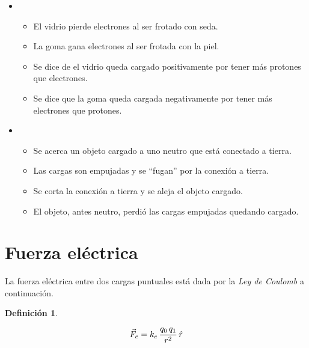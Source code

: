 \documentclass[a5paper,12pt,twoside]{book}
\newtheorem{defn}{{Definición}}[chapter]
\begin{document}
\begin{itemize}
    \item {}
    
    \begin{itemize}
        \item El vidrio pierde electrones al ser frotado con seda.
        \item La goma gana electrones al ser frotada con la piel.
        \item Se dice de el vidrio queda cargado positivamente por tener más protones que electrones.
        \item Se dice que la goma queda cargada negativamente por tener más electrones que protones.
    \end{itemize}

    \item {}
    
    \begin{itemize}
        \item Se acerca un objeto cargado a uno neutro que está conectado a tierra.
        \item Las cargas son empujadas y se ``fugan'' por la conexión a tierra.
        \item Se corta la conexión a tierra y se aleja el objeto cargado.
        \item El objeto, antes neutro, perdió las cargas empujadas quedando cargado.
    \end{itemize}

    \begin{center}
        \def\svgwidth{\linewidth}
        
    \end{center}
\end{itemize}


\section{Fuerza eléctrica}

La fuerza eléctrica entre dos cargas puntuales está dada por la \emph{Ley de Coulomb} a continuación.

\begin{mdframed}[style=MyFrame1]
    \begin{defn}
    \end{defn}
    \begin{equation*}
        \Vec{F}_e = k_e \, \frac{ q_0 \, q_1}{r^2} \, \hat{r}
    \end{equation*}
\end{mdframed}
\end{document}
